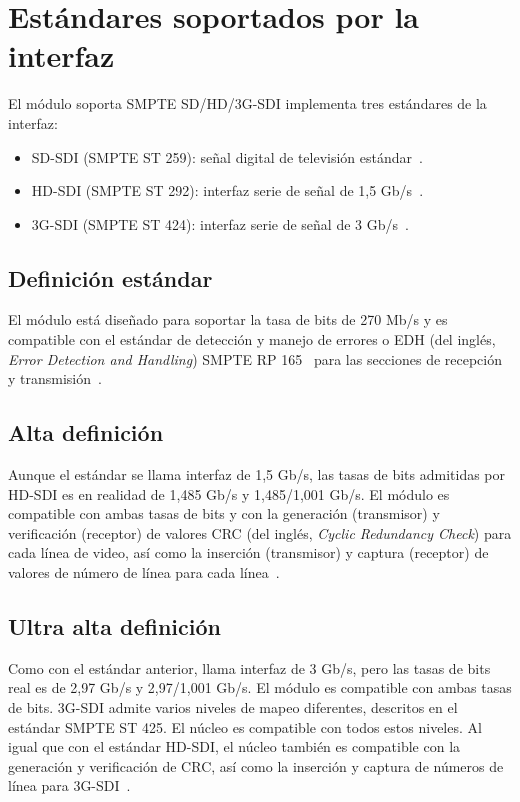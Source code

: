 \section{Estándares soportados por la interfaz}

  El módulo soporta SMPTE SD/HD/3G-SDI implementa tres estándares de la interfaz:

  \begin{itemize}
      \item SD-SDI (SMPTE ST 259): señal digital de televisión estándar~\citep{st259}.
      \item HD-SDI (SMPTE ST 292): interfaz serie de señal de 1,5 Gb/s~\citep{st292}.
      \item 3G-SDI (SMPTE ST 424): interfaz serie de señal de 3 Gb/s~\citep{st424}.
  \end{itemize}

  \subsection{Definición estándar}

  El módulo está diseñado para soportar la tasa de bits de 270 Mb/s y es compatible
  con el estándar de detección y manejo de errores o EDH (del inglés, \textit{Error
  Detection and Handling}) SMPTE RP 165~\citep{st165} para las secciones de
  recepción y transmisión~\citep{castr}.

  \subsection{Alta definición}

  Aunque el estándar se llama interfaz de 1,5 Gb/s, las tasas de bits admitidas
  por HD-SDI es en realidad de 1,485 Gb/s y 1,485/1,001 Gb/s. El módulo es
  compatible con ambas tasas de bits y con la generación (transmisor) y
  verificación (receptor) de valores CRC (del inglés, \textit{Cyclic Redundancy Check})
  para cada línea de video, así como la inserción (transmisor) y captura (receptor)
  de valores de número de línea para cada línea~\citep{castr}.

  \subsection{Ultra alta definición}

  Como con el estándar anterior, llama interfaz de 3 Gb/s, pero las tasas de bits
  real es de 2,97 Gb/s y 2,97/1,001 Gb/s. El módulo es compatible con ambas tasas
  de bits. 3G-SDI admite varios niveles de mapeo diferentes, descritos en el
  estándar SMPTE ST 425. El núcleo es compatible con todos estos niveles. Al
  igual que con el estándar HD-SDI, el núcleo también es compatible con la
  generación y verificación de CRC, así como la inserción y captura de números de
  línea para 3G-SDI\@~\citep{castr}.

